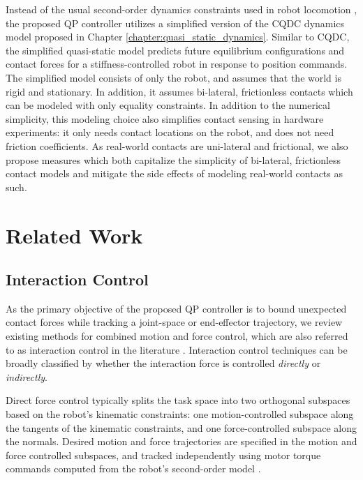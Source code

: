 Instead of the usual second-order dynamics constraints used in robot locomotion \cite{kuindersma2014efficiently, koolen2016design}, the proposed QP controller utilizes a simplified version of the CQDC dynamics model proposed in Chapter \ref{chapter:quasi_static_dynamics}. 
Similar to CQDC, the simplified quasi-static model predicts future equilibrium configurations and contact forces for a stiffness-controlled robot in response to position commands.
The simplified model consists of only the robot, and assumes that the world is rigid and stationary. In addition, it assumes bi-lateral, frictionless contacts which can be modeled with only equality constraints. In addition to the numerical simplicity, this modeling choice also simplifies contact sensing in hardware experiments: it only needs contact locations on the robot, and does not need friction coefficients. 
As real-world contacts are uni-lateral and frictional, we also propose measures which both capitalize the simplicity of bi-lateral, frictionless contact models and mitigate the side effects of modeling real-world contacts as such.


\section{Related Work  \label{sec:related_work}}
\subsection{Interaction Control}
As the primary objective of the proposed QP controller is to bound unexpected contact forces while tracking a joint-space or end-effector trajectory, we review existing methods for combined motion and force control, which are also referred to as interaction control in the literature \cite[Chapter~9]{siciliano2008springer}. Interaction control techniques can be broadly classified by whether the interaction force is controlled \textit{directly} or \textit{indirectly}. 

Direct force control typically splits the task space into two orthogonal subspaces based on the robot's kinematic constraints: one motion-controlled subspace along the tangents of the kinematic constraints, and one force-controlled subspace along the normals. Desired motion and force trajectories are specified in the motion and force controlled subspaces, and tracked independently using motor torque commands computed from the robot's second-order model \cite{mason1981compliance, khatib1987unified, raibert1981hybrid}. 

